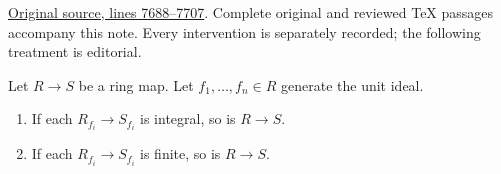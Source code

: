 \hypertarget{algebra-context-078}{}

\noindent\href{https://github.com/stacks/stacks-project/blob/a04446e57ec1fbc252a871afcec7752fb2807b14/algebra.tex\#L7688}{Original source, lines 7688--7707}. Complete original and reviewed TeX passages accompany this note. Every intervention is separately recorded; the following treatment is editorial.


\begin{lemma}
\label{editorial-source-lemma-integral-local}
Let $R \to S$ be a ring map.
Let $f_1, \ldots, f_n \in R$ generate the unit ideal.
\begin{enumerate}
\item If each $R_{f_i} \to S_{f_i}$ is integral, so is $R \to S$.
\item If each $R_{f_i} \to S_{f_i}$ is finite, so is $R \to S$.
\end{enumerate}
\end{lemma}

